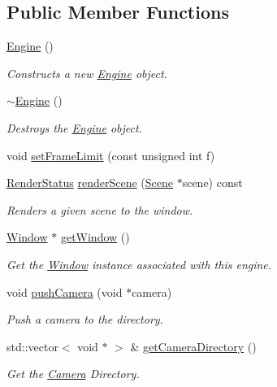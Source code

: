 \subsection*{Public Member Functions}
\begin{DoxyCompactItemize}
\item 
\hyperlink{classpcs_1_1Engine_a73a5c3ce66c2c033835f19f95b67f3ea}{Engine} ()
\begin{DoxyCompactList}\small\item\em Constructs a new \hyperlink{classpcs_1_1Engine}{Engine} object. \end{DoxyCompactList}\item 
\hyperlink{classpcs_1_1Engine_aa6a523009abf3a61d9682a846c780207}{$\sim$\+Engine} ()
\begin{DoxyCompactList}\small\item\em Destroys the \hyperlink{classpcs_1_1Engine}{Engine} object. \end{DoxyCompactList}\item 
void \hyperlink{classpcs_1_1Engine_adafee2edd651c84c76e5f382afd7089b}{set\+Frame\+Limit} (const unsigned int f)
\item 
\hyperlink{namespacepcs_a979c2971659f1655c7ebe27752b8a9a0}{Render\+Status} \hyperlink{classpcs_1_1Engine_ad99225f71f2e1dd2b02bd99ad2c59ab3}{render\+Scene} (\hyperlink{classpcs_1_1Scene}{Scene} $\ast$scene) const
\begin{DoxyCompactList}\small\item\em Renders a given scene to the window. \end{DoxyCompactList}\item 
\hyperlink{classpcs_1_1Window}{Window} $\ast$ \hyperlink{classpcs_1_1Engine_a3bf8432ad5c397ea7bb3f95728fa9792}{get\+Window} ()
\begin{DoxyCompactList}\small\item\em Get the \hyperlink{classpcs_1_1Window}{Window} instance associated with this engine. \end{DoxyCompactList}\item 
void \hyperlink{classpcs_1_1Engine_ab43d2dd55c8519da49f92e7ccef042a8}{push\+Camera} (void $\ast$camera)
\begin{DoxyCompactList}\small\item\em Push a camera to the directory. \end{DoxyCompactList}\item 
std\+::vector$<$ void $\ast$ $>$ \& \hyperlink{classpcs_1_1Engine_a71059ef96479c7ca59901bfa0be2587a}{get\+Camera\+Directory} ()
\begin{DoxyCompactList}\small\item\em Get the \hyperlink{classpcs_1_1Camera}{Camera} Directory. \end{DoxyCompactList}\end{DoxyCompactItemize}
